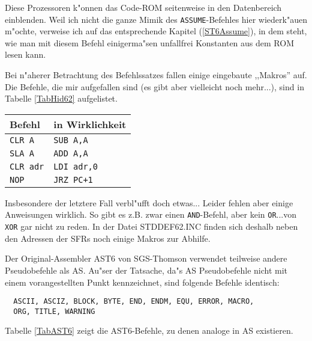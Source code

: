 \documentclass[12pt,a4paper,twoside]{report}
\newcommand{\tty}[1]{{\tt #1}}
\begin{document}
Diese Prozessoren k"onnen das Code-ROM seitenweise in den Datenbereich
einblenden.  Weil ich nicht die ganze Mimik des \tty{ASSUME}-Befehles
hier wiederk"auen m"ochte, verweise ich auf das entsprechende Kapitel
(\ref{ST6Assume}), in dem steht, wie man mit diesem Befehl einigerma"sen
unfallfrei Konstanten aus dem ROM lesen kann.
\par
Bei n"aherer Betrachtung des Befehlssatzes fallen einige eingebaute
,,Makros'' auf.  Die Befehle, die mir aufgefallen sind (es gibt aber
vielleicht noch mehr...), sind in Tabelle \ref{TabHid62} aufgelistet.
\par
\begin{table*}[htbp]
\begin{center}\begin{tabular}{|l|l|}
\hline
Befehl   & in Wirklichkeit \\
\hline
\hline
\tty{CLR A}    & \tty{SUB A,A} \\
\tty{SLA A}    & \tty{ADD A,A} \\
\tty{CLR adr}  & \tty{LDI adr,0} \\
\tty{NOP}      & \tty{JRZ PC+1} \\
\hline
\end{tabular}\end{center}
\caption{versteckte Makros im ST6225-Befehlssatz\label{TabHid62}}
\end{table*}
Insbesondere der letztere Fall verbl"ufft doch etwas...
Leider fehlen aber einige Anweisungen wirklich.  So gibt es z.B. zwar einen
\tty{AND}-Befehl, aber kein \tty{OR}...von \tty{XOR} gar nicht zu
reden.  In der Datei  STDDEF62.INC finden sich deshalb neben den Adressen
der SFRs noch einige Makros zur Abhilfe.
\par
Der Original-Assembler AST6 von SGS-Thomson verwendet teilweise andere
Pseudobefehle als AS.  Au"ser der Tatsache, da"s AS Pseudobefehle nicht
mit einem vorangestellten Punkt kennzeichnet, sind folgende Befehle
identisch:
\begin{verbatim}
  ASCII, ASCIZ, BLOCK, BYTE, END, ENDM, EQU, ERROR, MACRO,
  ORG, TITLE, WARNING
\end{verbatim}
Tabelle \ref{TabAST6} zeigt die AST6-Befehle, zu denen analoge in AS
existieren.
\par
\end{document}
